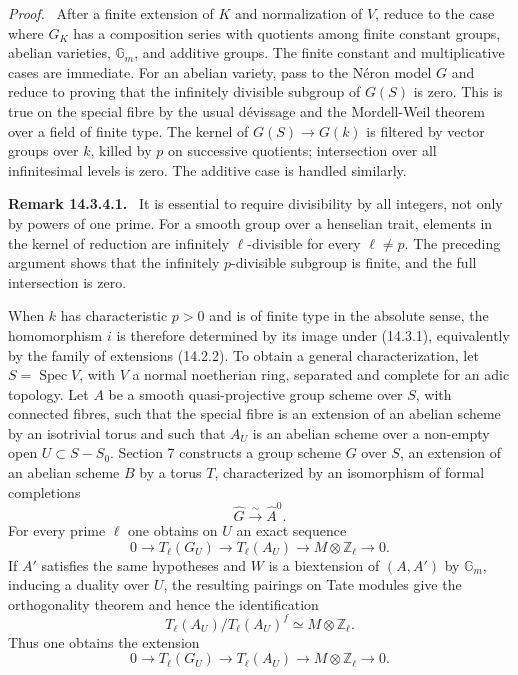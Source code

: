 \documentclass[12pt]{article}
\providecommand{\Spec}{\operatorname{Spec}}
\providecommand{\Z}{\mathbb Z}
\providecommand{\Gm}{\mathbb G_m}
\newenvironment{prooftext}{\par\noindent\emph{Proof.}\ }{\par\medskip}
\newenvironment{remarktext}[1]{\par\medskip\noindent\textbf{#1.}\ }{\par\medskip}
\begin{document}
\begin{prooftext}
After a finite extension of $K$ and normalization of $V$, reduce to the case where $G_K$ has a composition series with quotients among finite constant groups, abelian varieties, $\Gm$, and additive groups.  The finite constant and multiplicative cases are immediate.  For an abelian variety, pass to the N\'eron model $G$ and reduce to proving that the infinitely divisible subgroup of $G(S)$ is zero.  This is true on the special fibre by the usual d\'evissage and the Mordell-Weil theorem over a field of finite type.  The kernel of $G(S)\to G(k)$ is filtered by vector groups over $k$, killed by $p$ on successive quotients; intersection over all infinitesimal levels is zero.  The additive case is handled similarly.
\end{prooftext}

\begin{remarktext}{Remark 14.3.4.1}
It is essential to require divisibility by all integers, not only by powers of one prime.  For a smooth group over a henselian trait, elements in the kernel of reduction are infinitely $\ell$-divisible for every $\ell\ne p$.  The preceding argument shows that the infinitely $p$-divisible subgroup is finite, and the full intersection is zero.
\end{remarktext}

When $k$ has characteristic $p>0$ and is of finite type in the absolute sense, the homomorphism $i$ is therefore determined by its image under (14.3.1), equivalently by the family of extensions (14.2.2).  To obtain a general characterization, let $S=\Spec V$, with $V$ a normal noetherian ring, separated and complete for an adic topology.  Let $A$ be a smooth quasi-projective group scheme over $S$, with connected fibres, such that the special fibre is an extension of an abelian scheme by an isotrivial torus and such that $A_U$ is an abelian scheme over a non-empty open $U\subset S-S_0$.  Section 7 constructs a group scheme $G$ over $S$, an extension of an abelian scheme $B$ by a torus $T$, characterized by an isomorphism of formal completions
\begin{equation}\tag{14.3.5.1}
        \widehat G\xrightarrow{\sim}\widehat A^0.
\end{equation}
For every prime $\ell$ one obtains on $U$ an exact sequence
\begin{equation}\tag{14.3.5.3}
        0\longrightarrow T_\ell(G_U)\longrightarrow T_\ell(A_U)
        \longrightarrow M\otimes\Z_\ell\longrightarrow0.
\end{equation}
If $A'$ satisfies the same hypotheses and $W$ is a biextension of $(A,A')$ by $\Gm$, inducing a duality over $U$, the resulting pairings on Tate modules give the orthogonality theorem and hence the identification
\begin{equation}\tag{14.3.5.5}
        T_\ell(A_U)/T_\ell(A_U)^f\simeq M\otimes\Z_\ell.
\end{equation}
Thus one obtains the extension
\begin{equation}\tag{14.3.5.6}
        0\longrightarrow T_\ell(G_U)\longrightarrow T_\ell(A_U)
        \longrightarrow M\otimes\Z_\ell\longrightarrow0.
\end{equation}
\end{document}
